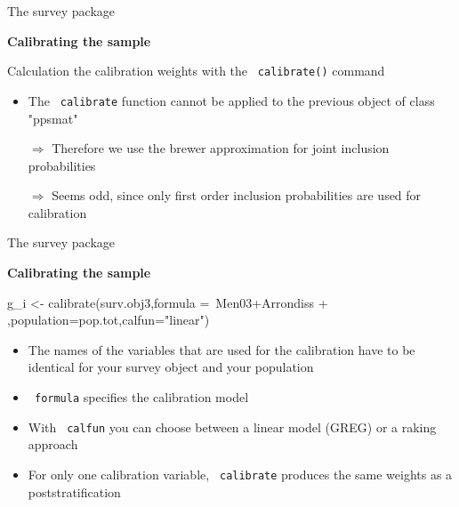 \documentclass[11pt,german,hideothersubsections]{beamer}
\newcommand{\R}[1]{{\tt \color{blue}  #1}}
\begin{document}
\begin{frame}[fragile]{The survey package}
\footnotesize{
\begin{center}
\textbf{Calibrating the sample}
\end{center}

\begin{itemize}\footnotesize{
\item Calculation the calibration weights with the \R{calibrate()} command}
\end{itemize}

\begin{Schunk}
\end{Schunk}
\begin{itemize}
\item The \R{calibrate} function cannot be applied to the previous object of class "ppsmat"
\item[$\Rightarrow$] Therefore we use the brewer approximation for joint inclusion probabilities
\pause\item[$\Rightarrow$] Seems odd, since only first order inclusion probabilities are used for calibration
\end{itemize}
}
\end{frame}
\begin{frame}[fragile]{The survey package}
\footnotesize{
\begin{center}
\textbf{Calibrating the sample}
\end{center}

\begin{Schunk}
\begin{Sinput}
 g_i <- calibrate(surv.obj3,formula =~Men03+Arrondiss
+                  ,population=pop.tot,calfun="linear")
\end{Sinput}
\end{Schunk}
\begin{itemize}
\item The names of the variables that are used for the calibration have to be identical for your survey object and your population
\item \R{formula} specifies the calibration model
\item With \R{calfun} you can choose between a linear model (GREG) or a raking approach
\item For only one calibration variable, \R{calibrate} produces the same weights as a poststratification
\end{itemize}
}
\end{frame}
\end{document}
